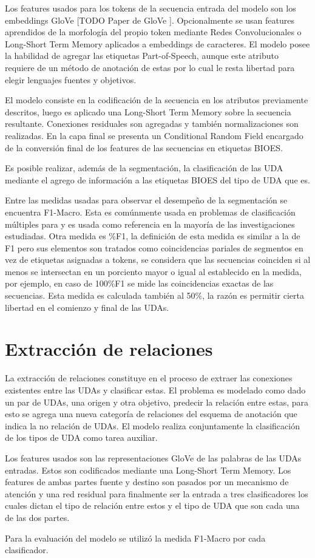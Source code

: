 Los features usados para los tokens de la secuencia entrada del modelo son los embeddings
GloVe [TODO Paper de GloVe \cite{}]. Opcionalmente se usan features aprendidos de la morfología
del propio token mediante Redes Convolucionales o Long-Short Term Memory aplicados a embeddings
de caracteres. El modelo posee la habilidad de agregar las etiquetas Part-of-Speech, aunque este
atributo requiere de un método de anotación de estas por lo cual le resta libertad para
elegir lenguajes fuentes y objetivos.

El modelo consiste en la codificación de la secuencia en los atributos previamente descritos,
luego es aplicado una Long-Short Term Memory sobre la secuencia resultante. Conexiones residuales
son agregadas y también normalizaciones son realizadas. En la capa final se presenta un Conditional
Random Field encargado de la conversión final de los features de las secuencias en etiquetas BIOES.

Es posible realizar, además de la segmentación, la clasificación de las UDA mediante el agrego de
información a las etiquetas BIOES del tipo de UDA que es.

Entre las medidas usadas para observar el desempeño de la segmentación se encuentra F1-Macro.
Esta es comúnmente usada en problemas de clasificación múltiples para y es usada como referencia
en la mayoría de las investigaciones estudiadas. Otra medida es \%F1, la definición de esta medida
es similar a la de F1 pero sus elementos son tratados como coincidencias pariales de segmentos en vez
de etiquetas asignadas a tokens, se considera que las secuencias coinciden si al menos se intersectan 
en un porciento mayor o igual al establecido en la medida, por ejemplo, en caso de 100\%F1 se mide
las coincidencias exactas de las secuencias. Esta medida es calculada también al 50\%, la razón es
permitir cierta libertad en el comienzo y final de las UDAs. 

\section{Extracción de relaciones}

La extracción de relaciones constituye en el proceso de extraer las conexiones existentes
entre las UDAs y clasificar estas. El problema es modelado como dado un par de UDAs, una origen
y otra objetivo, predecir
la relación entre estas, para esto se agrega una nueva categoría de relaciones del esquema de
anotación que indica la no relación de UDAs. El modelo realiza conjuntamente la clasificación
de los tipos de UDA como tarea auxiliar.

Los features usados son las representaciones GloVe de las palabras de las UDAs entradas. 
Estos son codificados mediante una Long-Short Term Memory. Los features de ambas partes
fuente y destino son pasados por un mecanismo de atención y una red residual para finalmente
ser la entrada a tres clasificadores los cuales dictan el tipo de relación entre estos y el tipo
de UDA que son cada una de las dos partes.

Para la evaluación del modelo se utilizó la medida F1-Macro por cada clasificador.